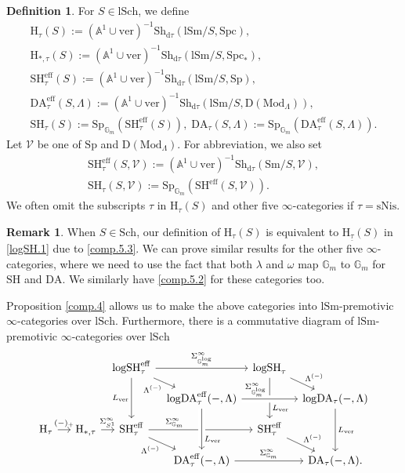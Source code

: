 \documentclass[10pt]{amsart}
\theoremstyle{definition}
\newtheorem{df}[thm]{Definition}
\newtheorem{rmk}[thm]{Remark}
\theoremstyle{remark}
\numberwithin{equation}{subsection}
\newcommand{\A}{\mathbb{A}}
\newcommand{\G}{\mathbb{G}}
\newcommand{\cV}{\mathcal{V}}
\newcommand{\rH}{\mathrm{H}}
\newcommand{\ul}{\underline}
\newcommand{\eff}{{\mathrm{eff}}}
\newcommand{\Spt}{\mathrm{Sp}}
\newcommand{\Sm}{\mathrm{Sm}}
\newcommand{\SH}{\mathrm{SH}}
\newcommand{\logSH}{\mathrm{logSH}}
\newcommand{\DLambda}{\mathrm{D}(\mathrm{Mod}_{\Lambda})}
\newcommand{\logDA}{\mathrm{log}\mathrm{DA}}
\newcommand{\DA}{\mathrm{DA}}
\newcommand{\Sch}{\mathrm{Sch}}
\newcommand{\lSch}{\mathrm{lSch}}
\newcommand{\lSm}{\mathrm{lSm}}
\newcommand{\infShv}{\mathrm{Sh}}
\newcommand{\Spc}{\mathrm{Spc}}
\newcommand{\Gmm}{\mathbb{G}_m^{\mathrm{log}}}
\newcommand{\Stab}{\mathrm{Sp}}
\newcommand{\ver}{\mathrm{ver}}
\newcommand{\dtau}{\mathrm{d}\tau}
\newcommand{\sNis}{\mathrm{sNis}}
\begin{document}
\begin{df}
\label{comp.3}
For $S\in \lSch$, we define
\begin{gather*}
\rH_{\tau}(S)
:=
(\A^1\cup \ver)^{-1}\infShv_{\dtau}(\lSm/S,\Spc),
\\
\rH_{*,\tau}(S)
:=
(\A^1\cup \ver)^{-1}\infShv_{\dtau}(\lSm/S,\Spc_*),
\\
\SH_{\tau}^\eff(S)
:=
(\A^1\cup \ver)^{-1}\infShv_{\dtau}(\lSm/S,\Spt),
\\
\DA_{\tau}^\eff(S,\Lambda)
:=
(\A^1\cup \ver)^{-1}\infShv_{\dtau}(\lSm/S,\DLambda),
\\
\SH_{\tau}(S)
:=
\Stab_{\G_m}(\SH_{\tau}^\eff(S)),
\;
\DA_{\tau}(S,\Lambda)
:=
\Stab_{\G_m}(\DA_{\tau}^\eff(S,\Lambda)).
\end{gather*}
Let $\cV$ be one of $\Spt$ and $\DLambda$.
For abbreviation, we also set
\begin{gather*}
\SH_{\tau}^\eff(S,\cV)
:=
(\A^1\cup \ver)^{-1}\infShv_{\dtau}(\Sm/S,\cV),
\\
\SH_{\tau}(S,\cV)
:=
\Stab_{\G_m}(\SH^\eff(S,\cV)).
\end{gather*}
We often omit the subscripts $\tau$ in $\rH_\tau(S)$ and other five $\infty$-categories if $\tau=\sNis$.
\end{df}

\begin{rmk}
\label{comp.7}
When $S\in \Sch$, our definition of $\rH_{\tau}(S)$ is equivalent to $\rH_{\ul{\tau}}(S)$ in \eqref{logSH.1} due to \eqref{comp.5.3}.
We can prove similar results for the other five $\infty$-categories, where we need to use the fact that both $\lambda$ and $\omega$ map $\G_m$ to $\G_m$ for $\SH$ and $\DA$.
We similarly have \eqref{comp.5.2} for these categories too.


Proposition \ref{comp.4} allows us to make the above categories into $\lSm$-premotivic $\infty$-categories over $\lSch$.
Furthermore, there is a commutative diagram of $\lSm$-premotivic $\infty$-categories over $\lSch$
\begin{equation}
\begin{tikzcd}[column sep=tiny, row sep=small]
&&
&
\logSH_{\tau}^\eff\ar[rr,"\Sigma_{\Gmm}^\infty"]\ar[dd,"L_{\ver}"']\ar[rd,"\Lambda^{(-)}"']&
&
\logSH_{\tau}\ar[dd,"L_{\ver}",near end]\ar[rd,"\Lambda^{(-)}"]
\\
&
&
&
&
\logDA^\eff_{\tau}(-,\Lambda)\ar[rr,"\Sigma_{\Gmm}^\infty",near start,crossing over]&
&
\logDA_{\tau}(-,\Lambda)\ar[dd,"L_{\ver}"]
\\
\rH_{\tau}\ar[rr,"(-)_+"]&&
\rH_{*,\tau}\ar[r,"\Sigma_{S^1}^\infty"]&
\SH_{\tau}^\eff\ar[rr,"\Sigma_{\G_m}^\infty",near start]\ar[rd,"\Lambda^{(-)}"']&
&
\SH_{\tau}^\eff\ar[rd,"\Lambda^{(-)}"]
\\
&
&
&
&
\DA_{\tau}^\eff(-,\Lambda)\ar[rr,"\Sigma_{\G_m}^\infty"]\ar[uu,leftarrow,"L_{\ver}"',crossing over,near start]&
&
\DA_{\tau}(-,\Lambda).
\end{tikzcd}
\end{equation}
\end{rmk}
\end{document}

